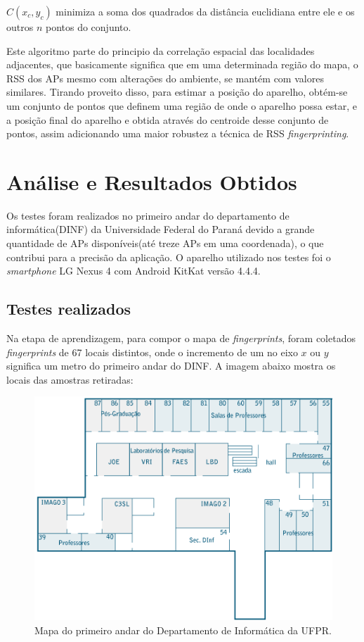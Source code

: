   $C(x_c,y_c)$ minimiza a soma dos quadrados da distância euclidiana entre ele e os outros $n$ pontos do conjunto\cite{centroid}.
  
      Este algoritmo parte do principio da correlação espacial das localidades adjacentes\cite{fingerPrint2}, 
  que basicamente significa que em uma determinada região do mapa, o RSS dos APs
  mesmo com alterações do ambiente, se mantém com valores similares. Tirando proveito disso, para estimar a posição do aparelho, 
  obtém-se um conjunto de pontos que definem uma região de onde o aparelho possa estar, e a posição final do aparelho 
  e obtida através do centroide desse conjunto de pontos, assim adicionando uma maior robustez 
  a técnica de RSS \textit{fingerprinting}.
  
  \section{Análise e Resultados Obtidos}
 
  Os testes foram realizados no primeiro andar do departamento de informática(DINF) da Universidade Federal do Paraná devido a 
  grande quantidade de APs disponíveis(até treze APs em uma coordenada), o que contribui para a precisão da aplicação.
  O aparelho utilizado nos testes foi o \textit{smartphone} LG Nexus 4 com Android KitKat versão 4.4.4.
  
  \subsection{Testes realizados}
  Na etapa de aprendizagem, para compor o mapa de \textit{fingerprints}, foram coletados \textit{fingerprints} de 67 locais distintos,
  onde o incremento de um no eixo $x$ ou $y$ significa um metro do primeiro andar do DINF. 
  A imagem abaixo mostra os locais das amostras retiradas:
   
   \begin{figure}[hbt]
  \centering
  \includegraphics[scale=0.9]{images/mapadinf_andar1_492x327.png}
  \caption{Mapa do primeiro andar do Departamento de Informática da UFPR.}
  \label{fig:mapaDinf}
  \end{figure}
     \clearpage
     
